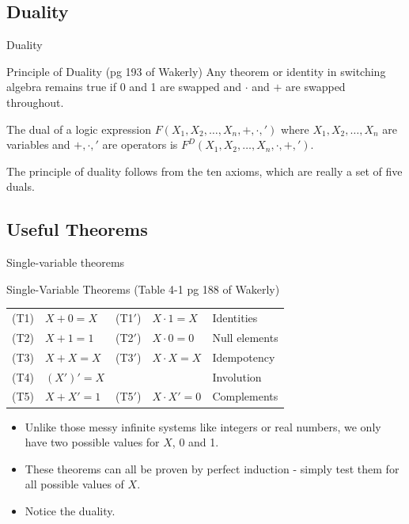 \subsection{Duality}

\begin{frame}{Duality}
  \begin{block}{Principle of Duality (pg 193 of Wakerly)}
    Any theorem or identity in switching algebra remains true if 0 and 1 are swapped and $\cdot$ and $+$ are swapped throughout.
  \end{block}
  \begin{definition}
    The \alert{dual of a logic expression} $F(X_1, X_2, \ldots, X_n, +, \cdot, ')$ where $X_1, X_2, \ldots, X_n$ are variables and $+,\cdot,'$ are operators is $F^D(X_1, X_2, \ldots, X_n, \cdot, +, ')$.
  \end{definition}
  The principle of duality follows from the ten axioms, which are really a set of five duals.
\end{frame}

\subsection{Useful Theorems}

\begin{frame}{Single-variable theorems}
  \begin{block}{Single-Variable Theorems (Table 4-1 pg 188 of Wakerly)}
    \begin{center}
      \begin{tabular}{lllll}
        (T1) & $X + 0 = X$ & (T1$'$) & $X \cdot 1 = X$ & Identities \\
        (T2) & $X + 1 = 1$ & (T2$'$) & $X \cdot 0 = 0$ & Null elements \\
        (T3) & $X + X = X$ & (T3$'$) & $X \cdot X = X$ & Idempotency \\
        (T4) & $(X')' = X$ & & & Involution \\
        (T5) & $X + X' = 1$ & (T5$'$) & $X \cdot X' = 0$ & Complements\\
      \end{tabular}
    \end{center}
  \end{block}
  \begin{itemize}
    \item Unlike those messy infinite systems like integers or real numbers, we only have two possible values for $X$, 0 and 1.
    \item These theorems can all be proven by \alert{perfect induction} - simply test them for all possible values of $X$.
    \item Notice the duality.
  \end{itemize}
\end{frame}

